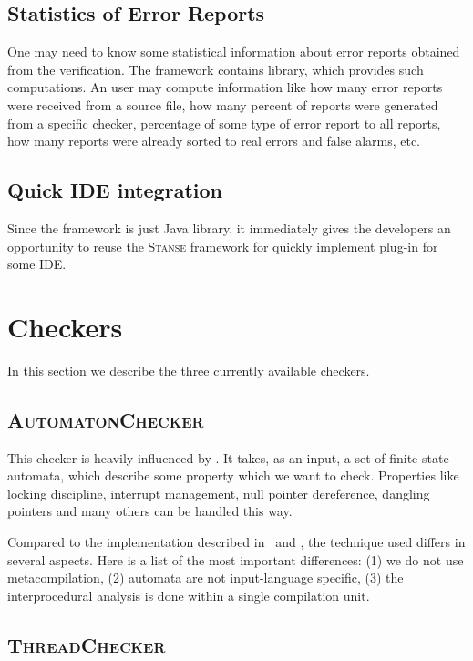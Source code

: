 \documentclass[10pt]{llncs}
\newcommand{\Stanse}{\textsc{Stanse}\xspace}
\newcommand{\TC}{\textsc{ThreadChecker}\xspace}
\newcommand{\AC}{\textsc{AutomatonChecker}\xspace}
\begin{document}
\subsection{Statistics of Error Reports}

One may need to know some statistical information about error reports obtained from the verification. The framework contains library, which provides such computations. An user may compute information like how many error reports were received from a source file, how many percent of reports were generated from a specific checker, percentage of some type of error report to all reports, how many reports were already sorted to real errors and false alarms, etc.

\subsection{Quick IDE integration}

Since the framework is just Java library, it immediately gives the developers an opportunity to reuse the \Stanse framework for quickly implement plug-in for some IDE.

\section{Checkers}
\label{sec:checkers}

In this section we describe the three currently available checkers.

\subsection{\AC}

This checker is heavily influenced by \cite{ECCH00}. It takes, as an input, a set of finite-state automata, which describe some property which we want to check. Properties like locking discipline, interrupt management, null pointer dereference, dangling pointers and many others can be handled this way.

Compared to the implementation described in~\cite{ECCH00} and \cite{HCXE02}, the technique used  differs in several aspects. Here is a list of the most important differences: (1) we do not use metacompilation, (2) automata are not input-language specific, (3) the interprocedural analysis is done within a single compilation unit.

\subsection{\TC}
\end{document}
